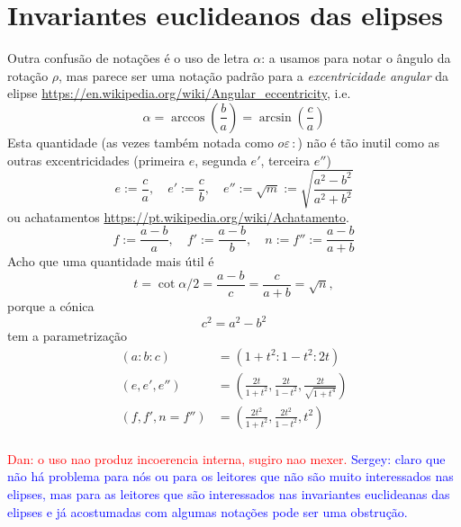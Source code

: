 \section{Invariantes euclideanos das elipses}

Outra confusão de notações é o uso de letra $\alpha$:
a usamos para notar o ângulo da rotação $ρ$,
mas parece ser uma notação padrão para a \emph{excentricidade angular} da elipse \url{https://en.wikipedia.org/wiki/Angular_eccentricity},
i.e.
\begin{equation*}
α = \arccos(\frac{b}{a}) = \arcsin(\frac{c}{a})
\end{equation*}
Esta quantidade (as vezes também notada como $o\!\varepsilon \,\!:$)
não é tão inutil como as outras excentricidades (primeira $e$, segunda $e'$, terceira $e''$)
\begin{equation*}
e := \frac{c}{a},\quad e' := \frac{c}{b},\quad e'' := \sqrt{m} := \sqrt{\frac{a^2-b^2}{a^2+b^2}}
\end{equation*}
ou achatamentos
\url{https://pt.wikipedia.org/wiki/Achatamento}.
\begin{equation*}
f := \frac{a-b}{a},\quad f' := \frac{a-b}{b},\quad n:= f'' := \frac{a-b}{a+b}
\end{equation*}
Acho que uma quantidade mais útil é
\begin{equation*}
  t = \cot{α/2} = \frac{a-b}{c} = \frac{c}{a+b} = \sqrt{n},
\end{equation*}
porque a cónica
\begin{equation*} 
c^2 = a^2 - b^2
\end{equation*}
tem a parametrização
\begin{align*}
     (a:b:c) &= (1+t^2 : 1-t^2 : 2t) \\
(e,e',e'')   &= (\frac{2t}{1+t^2}, \frac{2t}{1-t^2}, \frac{2t}{\sqrt{1+t^4}}) \\
(f,f',n=f'') &= (\frac{2t^2}{1+t^2}, \frac{2t^2}{1-t^2}, t^2) \\
\end{align*}

\bigskip
\textcolor{red}{Dan: o uso nao produz incoerencia interna, sugiro nao mexer.}
\smallskip
\textcolor{blue}{Sergey: claro que não há problema para nós ou para os leitores
que não são muito interessados nas elipses,
mas para as leitores que são interessados nas invariantes euclideanas das elipses
e já acostumadas com algumas notações pode ser uma obstrução.}


